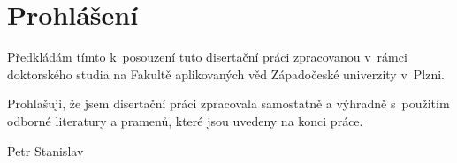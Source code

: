 \thispagestyle{empty}
\chapter*{Prohlášení}

\noindent Předkládám tímto  k~posouzení tuto disertační práci zpracovanou v~rámci doktorského studia na Fakultě aplikovaných věd Západočeské univerzity v~Plzni.

\vspace*{1cm}

\noindent Prohlašuji, že jsem disertační práci zpracovala samostatně a výhradně s~použitím odborné literatury a pramenů, které jsou uvedeny na konci práce.

\vspace*{2cm}


 \hspace*{8cm} {Petr Stanislav}
